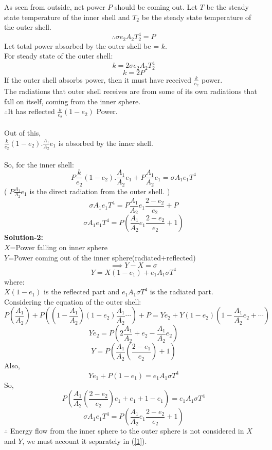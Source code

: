\documentclass[11pt,a4paper]{scrartcl}
\begin{document}
\begin{solution}
\begin{center}
\end{center}
\normalsize{As seen from outside, net power} $P$ should be coming out.
Let $ T$ be the steady state temperature of the inner shell and $T_2$ be the steady state temperature of the outer shell.\\
$$\therefore \sigma e_2 A_2 T_{2}^4 = P$$
Let total power absorbed by the outer shell be = $k$.\\
For steady state of the outer shell:\\
$$k = 2\sigma e_2 A_2 T_{2}^4 $$
$$k=2P$$
If the outer shell absorbs power, then it must have received $\frac{k}{e_2}$ power.\\
The radiations that outer shell receives are from some of its own radiations that fall on itself, coming from the inner sphere.\\
$\therefore$It has reflected $\frac{k}{e_2}(1-e_2)$ Power.\\
\\
Out of this, \\
$\frac{k}{e_2}(1-e_2). \frac{A_1}{A_2}e_1$ is absorbed by the inner shell.\\
\\
So, for the inner shell:
$$P\frac{k}{e_2}(1-e_2). \frac{A_1}{A_2}e_1+P \frac{A_1}{A_2} e_1 = \sigma A_1 e_1 T^4$$
( $P\frac{A_1}{A_2} e_1$ is the direct radiation from the outer shell. )
$$\sigma A_1 e_1 T^4= P \frac{A_1}{A_2} e_1 \frac{2-e_2}{e_2} + P$$
$$\boxed{\sigma A_1 e_1 T^4= P \left(\frac{A_1}{A_2} e_1 \frac{2-e_2}{e_2}+1\right)}$$
\Large{\textbf{Solution-2:}}\\
\normalsize{$X$=Power falling on inner sphere}\\
$Y$=Power coming out of the inner sphere(radiated+reflected)\\
$$\implies Y-X = \sigma$$
$$Y = X(1-e_1) + e_1 A_1 \sigma T^4$$
where:\\
$X(1-e_1)$ is the reflected part and $e_1 A_1 \sigma T^4$ is the radiated part.\\
Considering the equation of the outer shell:
\begin{equation*}\label{1}
P\left(\frac{A_1}{A_2}\right)+P\left(\left(1-\frac{A_1}{A_2}\right)(1-e_2)\frac{A_1}{A_2} \cdots \right) + P =Ye_2 + Y(1-e_2) \left(1- \frac{A_1}{A_2}e_2+\cdots \right)
\end{equation*}
$$Ye_2 = P \left(2\frac{A_1}{A_2} + e_2 - \frac{A_1}{A_2}e_2\right)$$
$$Y = P \left(\frac{A_1}{A_2}\left(\frac{2-e_1}{e_2}\right)+1\right)$$
Also,
$$Ye_1 + P(1-e_1) = e_1 A_1 \sigma T^4$$
So,
$$P\left(\frac{A_1}{A_2} \left(\frac{2-e_2}{e_2}\right)e_1 + e_1 + 1 - e_1\right) = e_1 A_1 \sigma T^4$$
$$\boxed{\sigma A_1 e_1 T^4= P \left(\frac{A_1}{A_2} e_1 \frac{2-e_2}{e_2}+1\right)}$$
$\therefore$ Energy flow from the inner sphere to the outer sphere is not considered in $X$ and $Y$, we must account it separately in (\ref{1}).
\end{solution}
\end{document}
